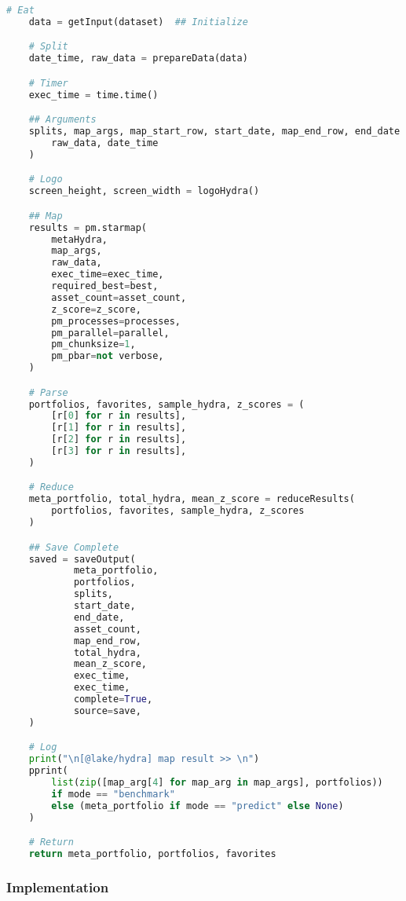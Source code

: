 \documentclass[11pt, a4paper]{awesome-cv}
\begin{document}
\begin{cvletter}
\begin{lstlisting}[language=Python]
    # Eat
    data = getInput(dataset)  ## Initialize

    # Split
    date_time, raw_data = prepareData(data)

    # Timer
    exec_time = time.time()

    ## Arguments
    splits, map_args, map_start_row, start_date, map_end_row, end_date = mapArguments(
        raw_data, date_time
    )

    # Logo
    screen_height, screen_width = logoHydra()

    ## Map
    results = pm.starmap(
        metaHydra,
        map_args,
        raw_data,
        exec_time=exec_time,
        required_best=best,
        asset_count=asset_count,
        z_score=z_score,
        pm_processes=processes,
        pm_parallel=parallel,
        pm_chunksize=1,
        pm_pbar=not verbose,
    )

    # Parse
    portfolios, favorites, sample_hydra, z_scores = (
        [r[0] for r in results],
        [r[1] for r in results],
        [r[2] for r in results],
        [r[3] for r in results],
    )

    # Reduce
    meta_portfolio, total_hydra, mean_z_score = reduceResults(
        portfolios, favorites, sample_hydra, z_scores
    )

    ## Save Complete
    saved = saveOutput(
            meta_portfolio,
            portfolios,
            splits,
            start_date,
            end_date,
            asset_count,
            map_end_row,
            total_hydra,
            mean_z_score,
            exec_time,
            exec_time,
            complete=True,
            source=save,
    )

    # Log
    print("\n[@lake/hydra] map result >> \n")
    pprint(
        list(zip([map_arg[4] for map_arg in map_args], portfolios))
        if mode == "benchmark"
        else (meta_portfolio if mode == "predict" else None)
    )

    # Return
    return meta_portfolio, portfolios, favorites
\end{lstlisting}


\subsubsection{Implementation}


\end{cvletter}
\end{document}
